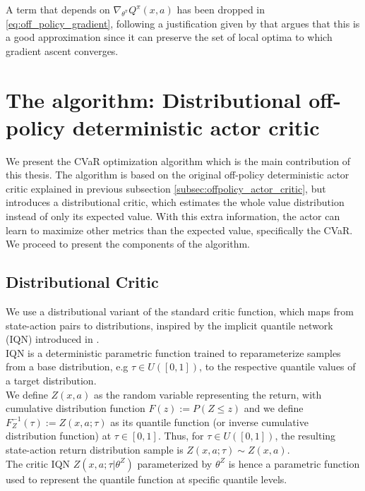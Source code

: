 A term that depends on $\nabla_{\theta^\pi} Q^{\pi}(x,a)$ has been 
dropped in \ref{eq:off_policy_gradient}, following a justification
given by \cite{Degris2012} that argues that this is a good approximation since it can
preserve the set of local optima to which gradient ascent converges.


\section{The algorithm: Distributional off-policy deterministic actor critic} \label{sec:distr_ddpg}
We present the CVaR optimization algorithm which is the main contribution of this thesis.
The algorithm is based on the original off-policy deterministic actor critic explained
in previous subsection \ref{subsec:offpolicy_actor_critic}, but introduces a distributional
critic, which estimates the whole value distribution instead of only its expected value.
With this extra information, the actor can learn to maximize other metrics than the expected value,
specifically the CVaR.
We proceed to present the components of the algorithm.


\subsection{Distributional Critic}
We use a distributional variant of the standard critic function,
which maps from state-action pairs to distributions, inspired by the implicit quantile network (IQN) introduced in \cite{Dabney2018b}.\\
IQN is a deterministic parametric function trained to reparameterize samples from a
base distribution, e.g $\tau \in U([0,1])$, to the respective
quantile values of a target distribution.\\
We define $Z(x,a)$ as the random variable representing the return, with cumulative 
distribution function $F(z):=P(Z\leq z)$ and we define $F^{-1}_Z(\tau):=Z(x,a;\tau)$ as its quantile function 
(or inverse cumulative distribution function)
at $\tau \in [0,1]$.
Thus, for $\tau \in U([0,1])$, the resulting state-action return distribution sample is
$Z(x,a;\tau)\sim Z(x,a)$.\\
The critic IQN $Z(x,a;\tau| \theta^Z)$ parameterized by $\theta^Z$  is hence a parametric function
used to represent the quantile function at specific quantile levels.


